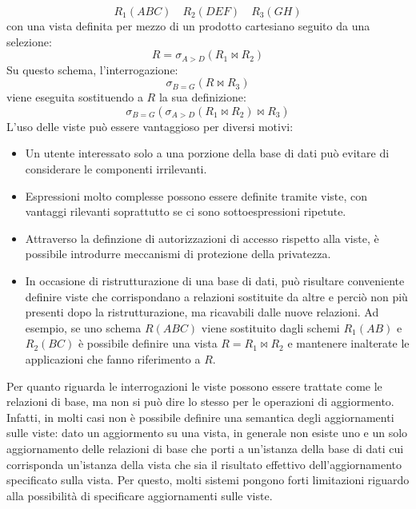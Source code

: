 \documentclass[12pt]{report}
\begin{document}
 	\[
 	R_1(ABC) \quad R_2(DEF) \quad R_3(GH)
 	\]
 	con una vista definita per mezzo di un prodotto cartesiano seguito da una selezione:
 	\[
 	R = \sigma_{A > D}(R_1 \bowtie R_2)
 	\]
 	Su questo schema, l'interrogazione:
 	\[
 	\sigma_{B = G}(R \bowtie R_3)
 	\]
 	viene eseguita sostituendo a $R$ la sua definizione:
 	\[
 	\sigma_{B=G}(\sigma_{A>D}(R_1 \bowtie R_2) \bowtie R_3)
 	\]
 	L'uso delle viste può essere vantaggioso per diversi motivi:
 	\begin{itemize}
 		\item Un utente interessato solo a una porzione della base di dati può evitare di considerare le componenti irrilevanti.
 		\item Espressioni molto complesse possono essere definite tramite viste, con vantaggi rilevanti soprattutto se ci sono sottoespressioni ripetute.
 		\item Attraverso la definzione di autorizzazioni di accesso rispetto alla viste, è possibile introdurre meccanismi di protezione della privatezza.
 		\item In occasione di ristrutturazione di una base di dati, può risultare conveniente definire viste che corrispondano a relazioni sostituite da altre e perciò non più presenti dopo la ristrutturazione, ma ricavabili dalle nuove relazioni. Ad esempio, se uno schema $R(ABC)$ viene sostituito dagli schemi $R_1(AB)$ e $R_2(BC)$ è possibile definire una vista $R = R_1 \bowtie R_2$ e mantenere inalterate le applicazioni che fanno riferimento a $R$.
 	\end{itemize}
 	Per quanto riguarda le interrogazioni le viste possono essere trattate come le relazioni di base, ma non si può dire lo stesso per le operazioni di aggiormento. Infatti, in molti casi non è possibile definire una semantica degli aggiornamenti sulle viste: dato un aggiormento su una vista, in generale non esiste uno e un solo aggiornamento delle relazioni di base che porti a un'istanza della base di dati cui corrisponda un'istanza della vista che sia il risultato effettivo dell'aggiornamento specificato sulla vista. Per questo, molti sistemi pongono forti limitazioni riguardo alla possibilità di specificare aggiornamenti sulle viste.
\end{document}
